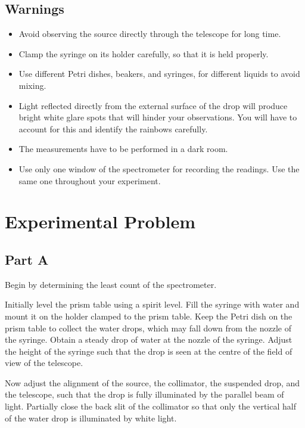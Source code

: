 \subsection*{Warnings}
\begin{itemize}
\item Avoid observing the source directly through the telescope for long time.
\item Clamp the syringe on its holder carefully, so that it is held properly.
\item Use different Petri dishes, beakers, and syringes, for different liquids to avoid mixing.
\item Light reflected directly from the external surface of the drop will produce bright white glare spots that will hinder your observations. You will have to account for this and identify the rainbows carefully. 
\item The measurements have to be performed in a dark room.
\item Use only one window of the spectrometer for recording the readings. Use the same one throughout your experiment.
\end{itemize}


\section*{Experimental Problem}
\subsection*{Part A}

\begin{imp}
Begin by determining the least count of the spectrometer.
\end{imp}

Initially level the prism table using a spirit level. Fill the syringe with water and mount it on the holder clamped to the prism table. Keep the Petri dish on the prism table to collect the water drops, which may fall down from the nozzle of the syringe. Obtain a steady drop of water at the nozzle of the syringe. Adjust the height of the syringe such that the drop is seen at the centre of the field of view of the telescope.

Now adjust the alignment of the source, the collimator, the suspended drop, and the telescope, such that the drop is fully illuminated by the parallel beam of light. Partially close the back slit of the collimator so that only the vertical half of the water drop is illuminated by white light.

